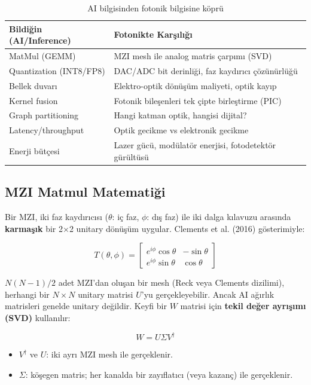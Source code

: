 \documentclass[11pt,a4paper]{article}
\begin{document}
\begin{table}[h!]
\centering
\small
\begin{tabular}{@{}p{5cm}p{9cm}@{}}
\toprule
\textbf{Bildiğin (AI/Inference)} & \textbf{Fotonikte Karşılığı} \\
\midrule
MatMul (GEMM) & MZI mesh ile analog matris çarpımı (SVD) \\
Quantization (INT8/FP8) & DAC/ADC bit derinliği, faz kaydırıcı çözünürlüğü \\
Bellek duvarı & Elektro-optik dönüşüm maliyeti, optik kayıp \\
Kernel fusion & Fotonik bileşenleri tek çipte birleştirme (PIC) \\
Graph partitioning & Hangi katman optik, hangisi dijital? \\
Latency/throughput & Optik gecikme vs elektronik gecikme \\
Enerji bütçesi & Lazer gücü, modülatör enerjisi, fotodetektör gürültüsü \\
\bottomrule
\end{tabular}
\caption{AI bilgisinden fotonik bilgisine köprü}
\end{table}

\subsection{MZI Matmul Matematiği}

Bir MZI, iki faz kaydırıcısı ($\theta$: iç faz, $\phi$: dış faz) ile iki dalga kılavuzu arasında \textbf{karmaşık} bir 2$\times$2 unitary dönüşüm uygular. Clements et al. (2016) gösterimiyle:

\begin{equation}
T(\theta, \phi) = \begin{bmatrix}
e^{i\phi}\cos\theta & -\sin\theta \\
e^{i\phi}\sin\theta & \cos\theta
\end{bmatrix}
\end{equation}

$N(N-1)/2$ adet MZI'dan oluşan bir mesh (Reck veya Clements dizilimi), herhangi bir $N\times N$ unitary matrisi $U$'yu gerçekleyebilir. Ancak AI ağırlık matrisleri genelde unitary değildir. Keyfi bir $W$ matrisi için \textbf{tekil değer ayrışımı (SVD)} kullanılır:

\begin{equation}
W = U \Sigma V^{\dagger}
\end{equation}

\begin{itemize}
    \item $V^{\dagger}$ ve $U$: iki ayrı MZI mesh ile gerçeklenir.
    \item $\Sigma$: köşegen matris; her kanalda bir zayıflatıcı (veya kazanç) ile gerçeklenir.
\end{itemize}
\end{document}
